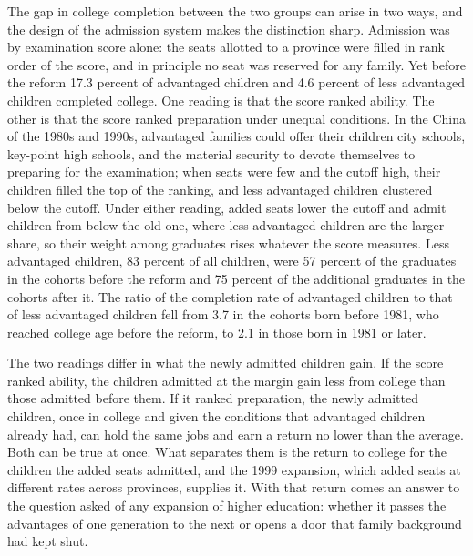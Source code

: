 \documentclass[11pt]{article}
\begin{document}
The gap in college completion between the two groups can arise in two ways, and the design of the admission system makes the distinction
sharp. Admission was by examination score alone: the seats allotted to
a province were filled in rank order of the score, and in principle
no seat was reserved for any family. Yet before the reform 17.3 percent of advantaged children and 4.6 percent of less advantaged children completed college. One reading is that the score ranked ability. The other is that
the score ranked preparation under unequal conditions. In the China of
the 1980s and 1990s, advantaged families could offer their children
city schools, key-point high schools, and the material security to devote themselves to preparing for the examination; when seats were few and the
cutoff high, their children filled the top of the ranking, and less advantaged children clustered below the cutoff. Under either reading,
added seats lower the cutoff and admit children from below the old
one, where less advantaged children are the larger share, so their
weight among graduates rises whatever the score measures. Less advantaged children, 83 percent of all children, were 57 percent of the graduates in the cohorts before the reform and 75 percent of the additional graduates in the cohorts after it. The ratio of the completion rate of advantaged children to that of less advantaged children fell from 3.7 in the cohorts born before 1981, who reached college age before the reform, to 2.1 in those born in 1981 or later.

The two readings differ
in what the newly admitted children gain. If the score ranked ability,
the children admitted at the margin gain less from college than those
admitted before them. If it ranked preparation, the newly admitted children, once in college and given the
conditions that advantaged children already had, can hold the same jobs and earn a return no lower
than the average. Both can be true at once. What
separates them is the return to college for the children the
added seats admitted, and the 1999 expansion, which added seats at
different rates across provinces, supplies it. With that return comes an answer to the question asked of any expansion of higher education: whether it
passes the advantages of one generation to the next or opens a door
that family background had kept shut.
\end{document}
